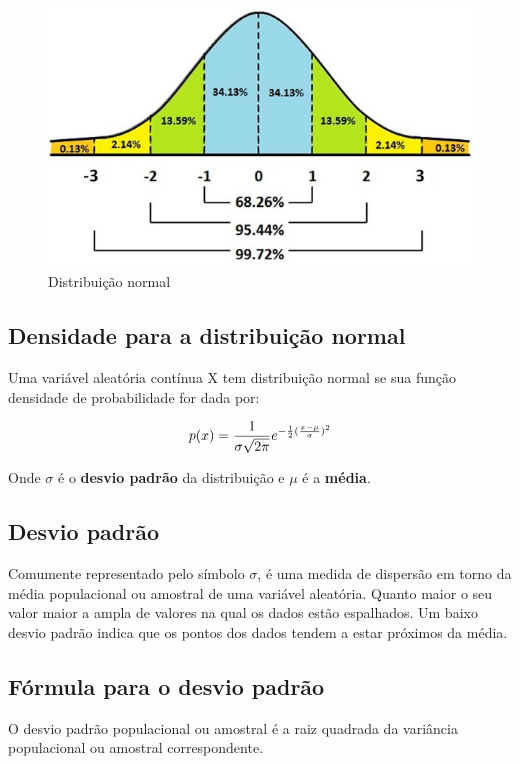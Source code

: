 \begin{figure}[H]
	\centering
	\includegraphics[width=1\textwidth]{./Imagens/Distribuição Normal/GA1.png} 
	\caption{Distribuição normal}
	\label{fig:GA1}
\end{figure}

\subsection{Densidade para a distribuição normal}
Uma variável aleatória contínua X tem distribuição normal se sua função densidade de probabilidade for dada por:

\[ \large p(x) = \frac{1}{\sigma \sqrt{2 \pi  }}e^{-\frac{1}{2} (\frac{x-\mu}{\sigma})^2} \]

Onde $\sigma$ é o \textbf{desvio padrão} da distribuição e $\mu$ é a \textbf{média}.

\subsection{Desvio padrão}

Comumente representado pelo símbolo $\sigma$, é uma medida de dispersão em torno da média populacional ou amostral de uma variável aleatória. Quanto maior o seu valor maior a ampla de valores na qual os dados estão espalhados. Um baixo desvio padrão indica que os pontos dos dados tendem a estar próximos da média.

\subsection{Fórmula para o desvio padrão}

O desvio padrão populacional ou amostral é a raiz quadrada da variância populacional ou amostral correspondente. 


